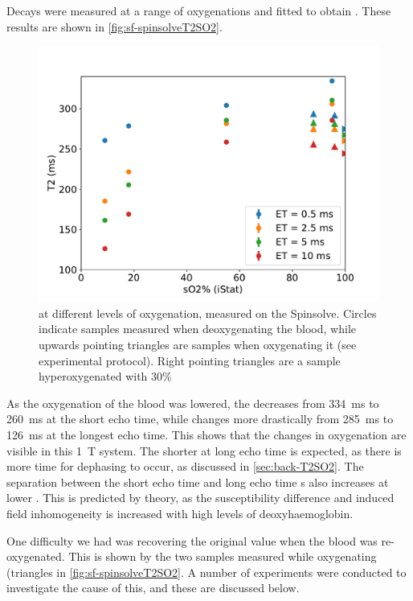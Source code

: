 Decays were measured at a range of oxygenations and fitted to obtain \Ttwo.
These results are shown in \autoref{fig:sf-spinsolveT2SO2}.

\begin{figure}[ht]
\centering
\includegraphics[width=\textwidth]{figures/stoppedflow/spinsolveT2SO2down.pdf}
\caption[\Ttwo vs. \SOtwo measured on the Spinsolve]{\Ttwo at different levels of oxygenation, measured on the Spinsolve. Circles indicate samples measured when deoxygenating the blood, while upwards pointing triangles are samples when oxygenating it (see experimental protocol). Right pointing triangles are a sample hyperoxygenated with 30\% \Otwo}
\label{fig:sf-spinsolveT2SO2}
\end{figure}

As the oxygenation of the blood was lowered, the \Ttwo decreases from \SI{334}{ms} to \SI{260}{ms} at the short echo time, while changes more drastically from \SI{285}{ms} to \SI{126}{ms} at the longest echo time.
This shows that the changes in oxygenation are visible in this \SI{1}{T} system.
The shorter \Ttwo at long echo time is expected, as there is more time for dephasing to occur, as discussed in \autoref{sec:back-T2SO2}.
The separation between the short echo time and long echo time \Ttwo{}s also increases at lower \SOtwo.
This is predicted by theory, as the susceptibility difference and induced field inhomogeneity is increased with high levels of deoxyhaemoglobin.

One difficulty we had was recovering the original \Ttwo value when the blood was re-oxygenated.
This is shown by the two samples measured while oxygenating (triangles in \autoref{fig:sf-spinsolveT2SO2}.
A number of experiments were conducted to investigate the cause of this, and these are discussed below.

